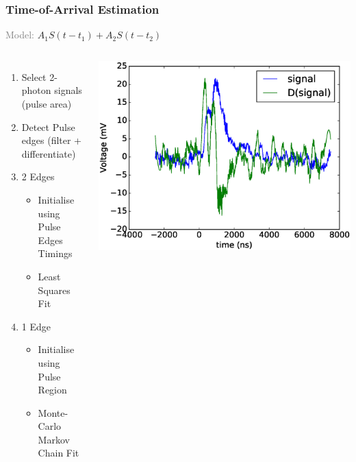 \begin{frame}\frametitle{Time-of-Arrival Estimation}
  \begin{center}
  \item \textcolor{gray}{Model:} $A_1S(t-t_1) + A_2S(t-t_2)$
  \begin{columns}
  \begin{enumerate}
    \item Select 2-photon signals (pulse area)
    \item Detect Pulse edges (filter + differentiate)
    \item 2 Edges
        \begin{itemize}
        \item Initialise using Pulse Edges Timings
        \item Least Squares Fit
        \end{itemize}
    \item 1 Edge
        \begin{itemize}
        \item Initialise using Pulse Region
        \item Monte-Carlo Markov Chain Fit
        \end{itemize}
  \end{enumerate}
  \includegraphics[width=\textwidth]{images/edge_detection_demonstration/edge_detection_by_diff.eps}
  \end{columns}
  \end{center}
\end{frame}


